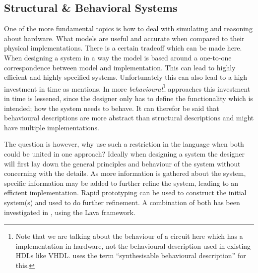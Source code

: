 \subsection{Structural \& Behavioral Systems}
One of the more fundamental topics is how to deal with simulating and reasoning about hardware.
What models are useful and accurate when compared to their physical implementations. 
There is a certain tradeoff which can be made here. 
When designing a system in a  way the model is based around a one-to-one correspondence between model and implementation.
This can lead to highly efficient and highly specified systems. 
Unfortunately this can also lead to a high investment in time as \cite{camposano1989synthesizing} mentions. 
In more \textit{behavioural}\footnote{Note that we are talking about the behaviour of a circuit here which has a implementation in hardware, not the behavioural description used in existing HDLs like VHDL. \cite{claessen2002embedded} uses the term ``synthesisable behavioural description'' for this.}  approaches this investment in time is lessened, since the designer only has to define the functionality which is intended; how the system needs to behave. 
It can therefor be said that behavioural descriptions are more abstract than structural descriptions and might have multiple implementations.

The question is however, why use such a restriction in the language when both could be united in one approach? 
Ideally when designing a system the designer will first lay down the general principles and behaviour of the system without concerning with the details.
As more information is gathered about the system, specific information may be added to further refine the system, leading to an efficient implementation. 
Rapid prototyping can be used to construct the initial system(s) and used to do further refinement.
A combination of both has been investigated in \cite{claessen2002embedded}, using the Lava framework\cite{bjesse1998lava}. 

